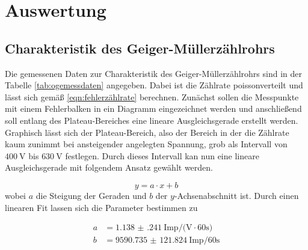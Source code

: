 \section{Auswertung}

\subsection{Charakteristik des Geiger-Müllerzählrohrs}

Die gemessenen Daten zur Charakteristik des Geiger-Müllerzählrohrs sind in der Tabelle \ref{tab:ogemessdaten}
angegeben. Dabei ist die Zählrate poissonverteilt und lässt sich gemäß  \ref{eqn:fehlerzählrate} berechnen.
\newline
Zunächst sollen die Messpunkte mit einem Fehlerbalken in ein Diagramm eingezeichnet werden und anschließend soll entlang des Plateau-Bereiches
eine lineare Ausgleichsgerade erstellt werden. Graphisch lässt sich der Plateau-Bereich, also der Bereich in der die Zählrate kaum zunimmt bei ansteigender angelegten Spannung, grob
als Intervall von $\SI{400}{\volt}$ bis $\SI{630}{\volt}$ festlegen. Durch dieses Intervall kan nun eine lineare Ausgleichsgerade mit folgendem Ansatz gewählt werden.

\begin{equation}
y = a \cdot x + b
\end{equation}
wobei $a$ die Steigung der Geraden und $b$ der $y$-Achsenabschnitt ist.
Durch einen linearen Fit lassen sich die Parameter bestimmen zu

\begin{align}
a &= \SI{1.138(241)}{{\text{Imp}}\per(\volt\cdot{60}\second)} \\
b &= \SI{9590.735(121824)}{{\text{Imp}}\per{60}\second}
\end{align}


